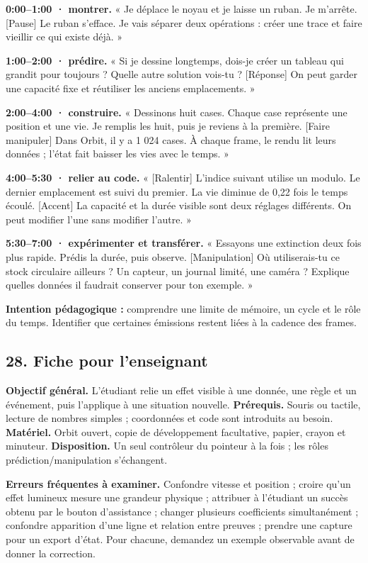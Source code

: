 \documentclass[
  canadien,
  11pt,
  letterpaper,
]{article}
\begin{document}
\textbf{0:00--1:00 · montrer.} « Je déplace le noyau et je laisse un
ruban. Je m'arrête. {[}Pause{]} Le ruban s'efface. Je vais séparer deux
opérations : créer une trace et faire vieillir ce qui existe déjà. »

\textbf{1:00--2:00 · prédire.} « Si je dessine longtemps, dois-je créer
un tableau qui grandit pour toujours ? Quelle autre solution vois-tu ?
{[}Réponse{]} On peut garder une capacité fixe et réutiliser les anciens
emplacements. »

\textbf{2:00--4:00 · construire.} « Dessinons huit cases. Chaque case
représente une position et une vie. Je remplis les huit, puis je reviens
à la première. {[}Faire manipuler{]} Dans Orbit, il y a 1 024 cases. À
chaque frame, le rendu lit leurs données ; l'état fait baisser les vies
avec le temps. »

\textbf{4:00--5:30 · relier au code.} « {[}Ralentir{]} L'indice suivant
utilise un modulo. Le dernier emplacement est suivi du premier. La vie
diminue de 0,22 fois le temps écoulé. {[}Accent{]} La capacité et la
durée visible sont deux réglages différents. On peut modifier l'une sans
modifier l'autre. »

\textbf{5:30--7:00 · expérimenter et transférer.} « Essayons une
extinction deux fois plus rapide. Prédis la durée, puis observe.
{[}Manipulation{]} Où utiliserais-tu ce stock circulaire ailleurs ? Un
capteur, un journal limité, une caméra ? Explique quelles données il
faudrait conserver pour ton exemple. »

\textbf{Intention pédagogique :} comprendre une limite de mémoire, un
cycle et le rôle du temps. Identifier que certaines émissions restent
liées à la cadence des frames.

\subsection{28. Fiche pour l'enseignant}\label{fiche-pour-lenseignant}

\textbf{Objectif général.} L'étudiant relie un effet visible à une
donnée, une règle et un événement, puis l'applique à une situation
nouvelle. \textbf{Prérequis.} Souris ou tactile, lecture de nombres
simples ; coordonnées et code sont introduits au besoin.
\textbf{Matériel.} Orbit ouvert, copie de développement facultative,
papier, crayon et minuteur. \textbf{Disposition.} Un seul contrôleur du
pointeur à la fois ; les rôles prédiction/manipulation s'échangent.

\textbf{Erreurs fréquentes à examiner.} Confondre vitesse et position ;
croire qu'un effet lumineux mesure une grandeur physique ; attribuer à
l'étudiant un succès obtenu par le bouton d'assistance ; changer
plusieurs coefficients simultanément ; confondre apparition d'une ligne
et relation entre preuves ; prendre une capture pour un export d'état.
Pour chacune, demandez un exemple observable avant de donner la
correction.
\end{document}
